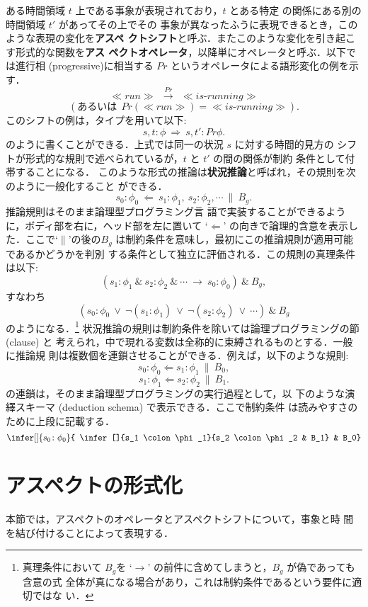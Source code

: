 ある時間領域 $t$ 上である事象が表現されており，$t$ とある特定
の関係にある別の時間領域 $t'$ があってその上でその
事象が異なったふうに表現できるとき，このような表現の変化を{\bf アスペ
クトシフト}と呼ぶ．またこのような変化を引き起こす形式的な関数を{\bf アス
ペクトオペレータ}，以降単にオペレータと呼ぶ．以下では進行相 
(progressive)に相当する $Pr$ というオペレータによる語形変化の例を示す．
\[ \ll run \gg ~~\stackrel{Pr}{\longrightarrow} ~~\ll is\mbox{-}running \gg \]
\[(\mbox{あるいは}~~Pr(\ll run \gg) =\ll is\mbox{-}running \gg ).\]
このシフトの例は，タイプを用いて以下:
\[s,t\colon \phi ~\Rightarrow~s,t'\colon Pr\phi.\]
のように書くことができる．上式では同一の状況 $s$ に対する時間的見方の
シフトが形式的な規則で述べられているが，$t$ と $t'$ の間の関係が制約
条件として付帯することになる．
このような形式の推論は{\bf 状況推論}と呼ばれ，その規則を次のように一般化すること
ができる．
\[ s_0\colon\phi_0 ~\Leftarrow ~s_1\colon \phi_1,~s_2 \colon
\phi_2, \cdots~\|~B_{g}.\] 推論規則はそのまま論理型プログラミング言
語で実装することができるように，ボディ部を右に，ヘッド部を左に置いて 
`$\Leftarrow$' の向きで論理的含意を表示した．ここで`$\|$'の後の$B_g$ 
は制約条件を意味し，最初にこの推論規則が適用可能であるかどうかを判別
する条件として独立に評価される．この規則の真理条件は以下:
\[(s_1\colon\phi_1 ~\& ~s_2\colon\phi_2 ~\&~\cdots ~
\rightarrow~s_0\colon\phi_0)~\&~B_g ,\]
すなわち
\[(s_0\colon\phi_0~
\vee ~\neg( s_1\colon\phi_1)~ \vee ~\neg(s_2\colon\phi_2)~ \vee ~
\cdots)~\&~B_g \]のようになる．\footnote{真理条件において $B_g$を 
`$\rightarrow$' の前件に含めてしまうと，$B_g$ が偽であっても含意の式
全体が真になる場合があり，これは制約条件であるという要件に適切ではな
い．} 
状況推論の規則は制約条件を除いては論理プログラミングの節 (clause) と
考えられ，中で現れる変数は全称的に束縛されるものとする．一般に推論規
則は複数個を連鎖させることができる．例えば，以下のような規則:
\[ s_0 \colon \phi_0 \Leftarrow s_1 \colon \phi_1~\|~B_0 , \] 
\[s_1 \colon \phi_1 \Leftarrow s_2 \colon \phi_2~\|~B_1 .\]
の連鎖は，そのまま論理型プログラミングの実行過程として，以
下のような演繹スキーマ (deduction schema) で表示できる．ここで制約条件
は読みやすさのために上段に記載する．
$$
\infer[]{s_0 \colon \phi_0}{
\infer[]{s_1 \colon \phi_1}{s_2 \colon \phi_2 & B_1}
& B_0}
$$

\section{アスペクトの形式化}\label{sec:acc}
本節では，アスペクトのオペレータとアスペクトシフトについて，事象と時
間を結び付けることによって表現する．

